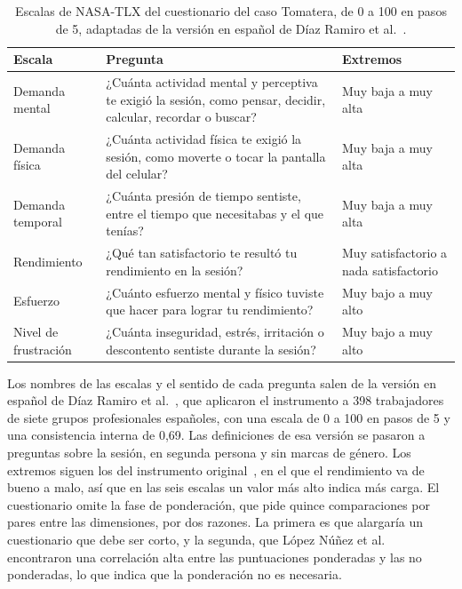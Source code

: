 \documentclass[12pt,letterpaper,oneside]{report}
\begin{document}
\begin{table}[H]
\caption[Escalas de NASA-TLX del cuestionario del caso Tomatera]{Escalas de
NASA-TLX del cuestionario del caso Tomatera, de 0 a 100 en pasos de 5, adaptadas
de la versión en español de Díaz Ramiro et al.~\cite{diaz2010nasatlx}.}
\label{tab:tlx_agricola}
\centering
\footnotesize
\renewcommand{\arraystretch}{1.12}
\begin{tabularx}{\textwidth}{@{}L{2.9cm} Y L{3.3cm}@{}}
\toprule
\textbf{Escala} & \textbf{Pregunta} & \textbf{Extremos} \\
\midrule
Demanda mental & ¿Cuánta actividad mental y perceptiva te exigió la sesión,
como pensar, decidir, calcular, recordar o buscar? & Muy baja a muy alta \\
Demanda física & ¿Cuánta actividad física te exigió la sesión, como moverte o
tocar la pantalla del celular? & Muy baja a muy alta \\
Demanda temporal & ¿Cuánta presión de tiempo sentiste, entre el tiempo que
necesitabas y el que tenías? & Muy baja a muy alta \\
Rendimiento & ¿Qué tan satisfactorio te resultó tu rendimiento en la sesión? &
Muy satisfactorio a nada satisfactorio \\
Esfuerzo & ¿Cuánto esfuerzo mental y físico tuviste que hacer para lograr tu
rendimiento? & Muy bajo a muy alto \\
Nivel de frustración & ¿Cuánta inseguridad, estrés, irritación o descontento
sentiste durante la sesión? & Muy bajo a muy alto \\
\bottomrule
\end{tabularx}
\end{table}

Los nombres de las escalas y el sentido de cada pregunta salen de la versión en
español de Díaz Ramiro et al.~\cite{diaz2010nasatlx}, que aplicaron el
instrumento a 398 trabajadores de siete grupos profesionales españoles, con una
escala de 0 a 100 en pasos de 5 y una consistencia interna de 0,69. Las
definiciones de esa versión se pasaron a preguntas sobre la sesión, en segunda
persona y sin marcas de género. Los extremos siguen los del instrumento
original~\cite{hart1988nasa}, en el que el rendimiento va de bueno a malo, así
que en las seis escalas un valor más alto indica más carga. El cuestionario
omite la fase de ponderación, que pide quince comparaciones por pares entre las
dimensiones, por dos razones. La primera es que alargaría un cuestionario que
debe ser corto, y la segunda, que López Núñez et
al.~\cite{lopez2010ponderacion} encontraron una correlación alta entre las
puntuaciones ponderadas y las no ponderadas, lo que indica que la ponderación
no es necesaria.
\end{document}
